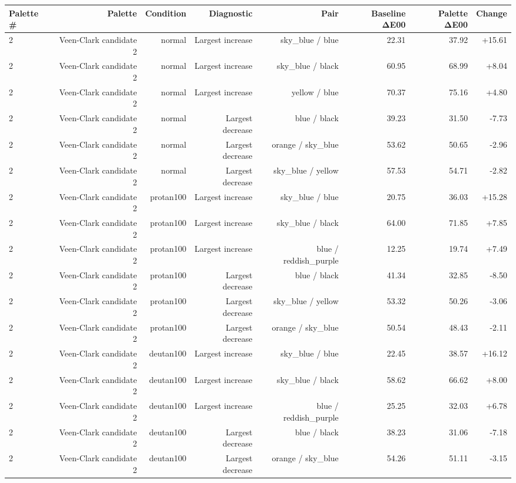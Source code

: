 \begin{tabular}{lrrrrrrr}
\toprule
Palette \# & Palette & Condition & Diagnostic & Pair & Baseline ΔE00 & Palette ΔE00 & Change \\
\midrule
2 & Veen-Clark candidate 2 & normal & Largest increase & sky\_blue / blue & 22.31 & 37.92 & +15.61 \\
2 & Veen-Clark candidate 2 & normal & Largest increase & sky\_blue / black & 60.95 & 68.99 & +8.04 \\
2 & Veen-Clark candidate 2 & normal & Largest increase & yellow / blue & 70.37 & 75.16 & +4.80 \\
2 & Veen-Clark candidate 2 & normal & Largest decrease & blue / black & 39.23 & 31.50 & -7.73 \\
2 & Veen-Clark candidate 2 & normal & Largest decrease & orange / sky\_blue & 53.62 & 50.65 & -2.96 \\
2 & Veen-Clark candidate 2 & normal & Largest decrease & sky\_blue / yellow & 57.53 & 54.71 & -2.82 \\
2 & Veen-Clark candidate 2 & protan100 & Largest increase & sky\_blue / blue & 20.75 & 36.03 & +15.28 \\
2 & Veen-Clark candidate 2 & protan100 & Largest increase & sky\_blue / black & 64.00 & 71.85 & +7.85 \\
2 & Veen-Clark candidate 2 & protan100 & Largest increase & blue / reddish\_purple & 12.25 & 19.74 & +7.49 \\
2 & Veen-Clark candidate 2 & protan100 & Largest decrease & blue / black & 41.34 & 32.85 & -8.50 \\
2 & Veen-Clark candidate 2 & protan100 & Largest decrease & sky\_blue / yellow & 53.32 & 50.26 & -3.06 \\
2 & Veen-Clark candidate 2 & protan100 & Largest decrease & orange / sky\_blue & 50.54 & 48.43 & -2.11 \\
2 & Veen-Clark candidate 2 & deutan100 & Largest increase & sky\_blue / blue & 22.45 & 38.57 & +16.12 \\
2 & Veen-Clark candidate 2 & deutan100 & Largest increase & sky\_blue / black & 58.62 & 66.62 & +8.00 \\
2 & Veen-Clark candidate 2 & deutan100 & Largest increase & blue / reddish\_purple & 25.25 & 32.03 & +6.78 \\
2 & Veen-Clark candidate 2 & deutan100 & Largest decrease & blue / black & 38.23 & 31.06 & -7.18 \\
2 & Veen-Clark candidate 2 & deutan100 & Largest decrease & orange / sky\_blue & 54.26 & 51.11 & -3.15 \\

\end{tabular}

